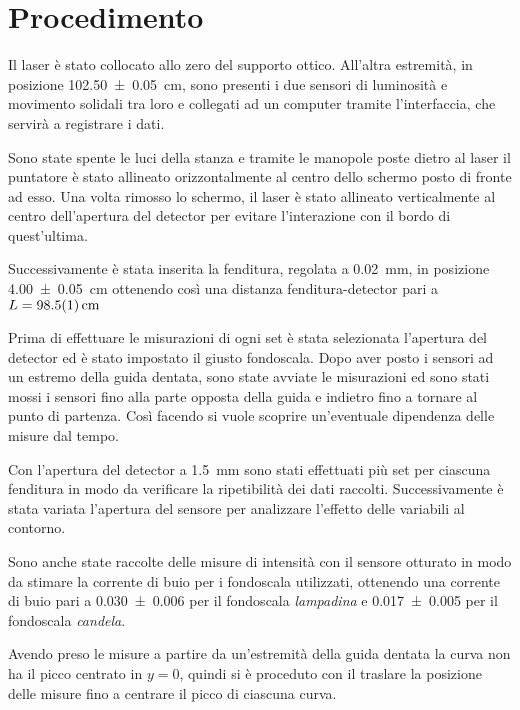 \documentclass[../main.tex]{subfiles}
\begin{document}
\section{Procedimento}

Il laser è stato collocato allo zero del supporto ottico. All’altra estremità, in posizione \qty{102.50+-0.05}{\cm}, sono presenti i due sensori di luminosità e movimento solidali tra loro e collegati ad un computer tramite l’interfaccia, che servirà a registrare i dati.

Sono state spente le luci della stanza e tramite le manopole poste dietro al laser il puntatore è stato allineato orizzontalmente al centro dello schermo posto di fronte ad esso. Una volta rimosso lo schermo, il laser è stato allineato verticalmente al centro dell'apertura del detector per evitare l'interazione con il bordo di quest'ultima.

Successivamente è stata inserita la fenditura, regolata a \qty{0.02}{\milli\meter}, in posizione \qty{4.00+-0.05}{\cm} ottenendo così una distanza fenditura-detector pari a $L = \qty{98.5+-0.1}{\cm}$

Prima di effettuare le misurazioni di ogni set è stata selezionata l'apertura del detector ed è stato impostato il giusto fondoscala. Dopo aver posto i sensori ad un estremo della guida dentata, sono state avviate le misurazioni ed sono stati mossi i sensori fino alla parte opposta della guida e indietro fino a tornare al punto di partenza. Così facendo si vuole scoprire un'eventuale dipendenza delle misure dal tempo.

Con l'apertura del detector a \qty{1.5}{\milli\meter} sono stati effettuati più set per ciascuna fenditura in modo da verificare la ripetibilità dei dati raccolti. Successivamente è stata variata l'apertura del sensore per analizzare l'effetto delle variabili al contorno.

Sono anche state raccolte delle misure di intensità con il sensore otturato in modo da stimare la corrente di buio per i fondoscala utilizzati, ottenendo una corrente di buio pari a \num{0.030+-0.006} per il fondoscala \textit{lampadina} e \num{0.017+-0.005} per il fondoscala \textit{candela}.

Avendo preso le misure a partire da un'estremità della guida dentata la curva non ha il picco centrato in $y = 0$, quindi si è proceduto con il traslare la posizione delle misure fino a centrare il picco di ciascuna curva.
\end{document}
